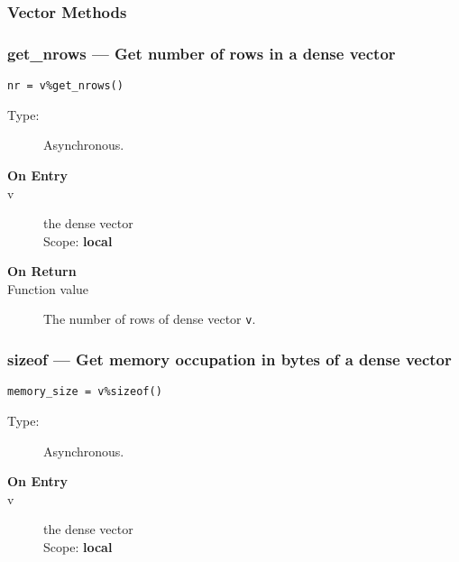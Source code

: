 \subsubsection{Vector Methods}
\subsubsection*{get\_nrows --- Get number of  rows in a dense vector}

\begin{verbatim}
nr = v%get_nrows()
\end{verbatim}

\begin{description}
\item[Type:] Asynchronous.
\item[\bf On Entry]
\item[v] the dense vector\\
Scope: {\bf local}\\
\end{description}

\begin{description}
\item[\bf On Return]
\item[Function value] The number of  rows  of dense vector \verb|v|.
\end{description}


\subsubsection*{sizeof  --- Get memory occupation in bytes
of  a dense vector}

\begin{verbatim}
memory_size = v%sizeof()
\end{verbatim}

\begin{description}
\item[Type:] Asynchronous.
\item[\bf On Entry]
\item[v] the dense vector\\
Scope: {\bf local}\\
\end{description}

